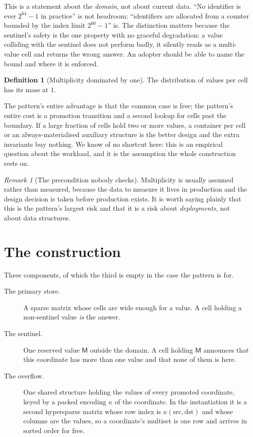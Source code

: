 \documentclass[11pt,a4paper]{article}
\theoremstyle{plain}
\theoremstyle{definition}
\newtheorem{definition}[theorem]{Definition}
\theoremstyle{remark}
\newtheorem{remark}[theorem]{Remark}
\newcommand{\M}{\mathsf{M}}
\begin{document}
This is a statement about the \emph{domain}, not about current data. ``No
identifier is ever $2^{64}-1$ in practice'' is not headroom; ``identifiers are
allocated from a counter bounded by the index limit $2^{60}-1$'' is. The
distinction matters because the sentinel's safety is the one property with no
graceful degradation: a value colliding with the sentinel does not perform
badly, it silently reads as a multi-value cell and returns the wrong answer.
An adopter should be able to name the bound and where it is enforced.

\begin{definition}[Multiplicity dominated by one]
The distribution of values per cell has its mass at $1$.
\end{definition}

The pattern's entire advantage is that the common case is free; the pattern's
entire cost is a promotion transition and a second lookup for cells past the
boundary. If a large fraction of cells hold two or more values, a container per
cell or an always-materialised auxiliary structure is the better design and the
extra invariants buy nothing. We know of no shortcut here: this is an empirical
question about the workload, and it is the assumption the whole construction
rests on.

\begin{remark}[The precondition nobody checks]
Multiplicity is usually assumed rather than measured, because the data to
measure it lives in production and the design decision is taken before
production exists. It is worth saying plainly that this is the pattern's
largest risk and that it is a risk about \emph{deployments}, not about data
structures.
\end{remark}

\section{The construction}
\label{sec:construction}

Three components, of which the third is empty in the case the pattern is for.

\begin{description}
  \item[The primary store.] A sparse matrix whose cells are wide enough for a
    value. A cell holding a non-sentinel value \emph{is} the answer.
  \item[The sentinel.] One reserved value $\M$ outside the domain. A cell
    holding $\M$ announces that this coordinate has more than one value and
    that none of them is here.
  \item[The overflow.] One shared structure holding the values of every
    promoted coordinate, keyed by a packed encoding $\kappa$ of the
    coordinate. In the instantiation it is a second hypersparse matrix whose
    row index is $\kappa(\text{src},\text{dst})$ and whose columns are the
    values, so a coordinate's multiset is one row and arrives in sorted order
    for free.
\end{description}
\end{document}
